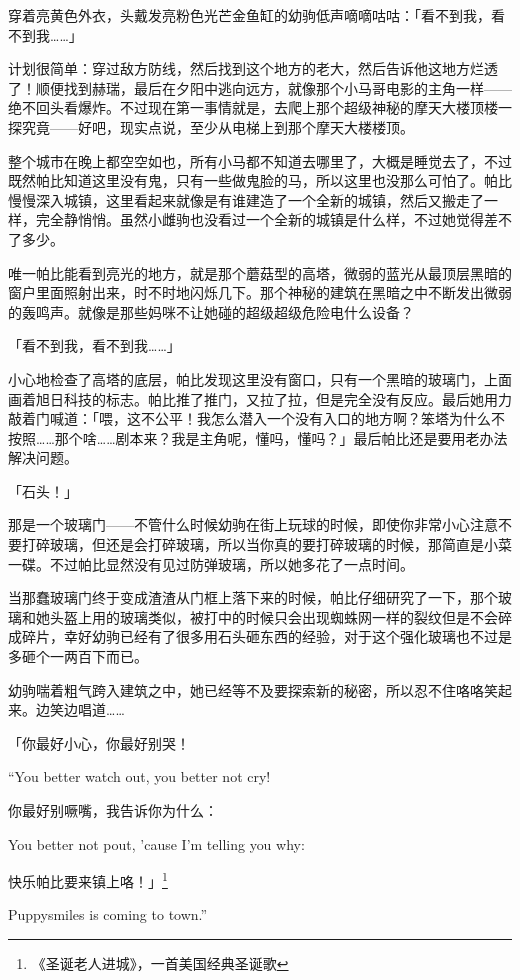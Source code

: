 穿着亮黄色外衣，头戴发亮粉色光芒金鱼缸的幼驹低声嘀嘀咕咕：「看不到我，看不到我……」

计划很简单：穿过敌方防线，然后找到这个地方的老大，然后告诉他这地方烂透了！顺便找到赫瑞，最后在夕阳中逃向远方，就像那个小马哥电影的主角一样——绝不回头看爆炸。不过现在第一事情就是，去爬上那个超级神秘的摩天大楼顶楼一探究竟——好吧，现实点说，至少从电梯上到那个摩天大楼楼顶。

整个城市在晚上都空空如也，所有小马都不知道去哪里了，大概是睡觉去了，不过既然帕比知道这里没有鬼，只有一些做鬼脸的马，所以这里也没那么可怕了。帕比慢慢深入城镇，这里看起来就像是有谁建造了一个全新的城镇，然后又搬走了一样，完全静悄悄。虽然小雌驹也没看过一个全新的城镇是什么样，不过她觉得差不了多少。

唯一帕比能看到亮光的地方，就是那个蘑菇型的高塔，微弱的蓝光从最顶层黑暗的窗户里面照射出来，时不时地闪烁几下。那个神秘的建筑在黑暗之中不断发出微弱的轰鸣声。就像是那些妈咪不让她碰的超级超级危险电什么设备？

「看不到我，看不到我……」

小心地检查了高塔的底层，帕比发现这里没有窗口，只有一个黑暗的玻璃门，上面画着旭日科技的标志。帕比推了推门，又拉了拉，但是完全没有反应。最后她用力敲着门喊道：「喂，这不公平！我怎么潜入一个没有入口的地方啊？笨塔为什么不按照……那个啥……剧本来？我是主角呢，懂吗，懂吗？」最后帕比还是要用老办法解决问题。

「石头！」

那是一个玻璃门——不管什么时候幼驹在街上玩球的时候，即使你非常小心注意不要打碎玻璃，但还是会打碎玻璃，所以当你真的要打碎玻璃的时候，那简直是小菜一碟。不过帕比显然没有见过防弹玻璃，所以她多花了一点时间。

当那蠢玻璃门终于变成渣渣从门框上落下来的时候，帕比仔细研究了一下，那个玻璃和她头盔上用的玻璃类似，被打中的时候只会出现蜘蛛网一样的裂纹但是不会碎成碎片，幸好幼驹已经有了很多用石头砸东西的经验，对于这个强化玻璃也不过是多砸个一两百下而已。

幼驹喘着粗气跨入建筑之中，她已经等不及要探索新的秘密，所以忍不住咯咯笑起来。边笑边唱道……

\begin{song}
「你最好小心，你最好别哭！


\begin{englishlyric}
    ``You better watch out, you better not cry!
\end{englishlyric}

\medskip

你最好别噘嘴，我告诉你为什么：


\begin{englishlyric}
    You better not pout, 'cause I'm telling you why:
\end{englishlyric}

\medskip

快乐帕比要来镇上咯！」\footnotespacefix\footnote{《圣诞老人进城》，一首美国经典圣诞歌}


\begin{englishlyric}
    Puppysmiles is coming to town.''
\end{englishlyric}
\end{song}

